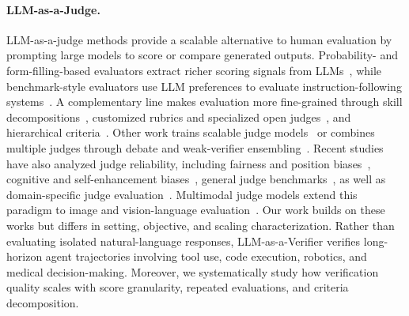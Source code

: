 \paragraph{LLM-as-a-Judge.}
LLM-as-a-judge methods provide a scalable alternative to human evaluation by prompting large models to score or compare generated outputs. Probability- and form-filling-based evaluators extract richer scoring signals from LLMs~\citep{fu2023gptscore,liu2023geval}, while benchmark-style evaluators use LLM preferences to evaluate instruction-following systems~\citep{zheng2023judging,dubois2024alpacaeval,li2024arenahard}. A complementary line makes evaluation more fine-grained through skill decompositions~\citep{ye2023flask}, customized rubrics and specialized open judges~\citep{kim2024prometheus,kim2024prometheus2,li2024autoj,hu2024themis}, and hierarchical criteria~\citep{liu2024hdeval}. Other work trains scalable judge models~\citep{wang2024pandalm,zhu2025judgelm} or combines multiple judges through debate and weak-verifier ensembling~\citep{chan2023chateval,saad2025shrinking}. Recent studies have also analyzed judge reliability, including fairness and position biases~\citep{wang2024large,zeng2024llmbar}, cognitive and self-enhancement biases~\citep{koo2023cobbler,liu2023narcissistic}, general judge benchmarks~\citep{tan2025judgebench,huang2025empirical}, as well as domain-specific judge evaluation~\citep{jiang2025codejudgebench}. Multimodal judge models extend this paradigm to image and vision-language evaluation~\citep{chen2024mllmjudge,lee2024prometheusvision,xiong2024llavacritic}. Our work builds on these works but differs in setting, objective, and scaling characterization. Rather than evaluating isolated natural-language responses, LLM-as-a-Verifier verifies long-horizon agent trajectories involving tool use, code execution, robotics, and medical decision-making. Moreover, we systematically study how verification quality scales with score granularity, repeated evaluations, and criteria decomposition. 

